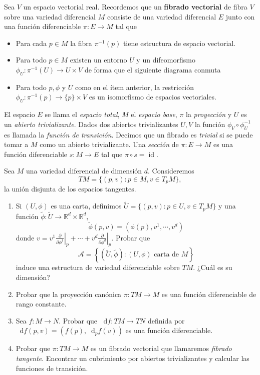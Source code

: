 \documentclass[12pt, a4paper]{amsart}
\theoremstyle{definition}
\newcommand{\RR}{\mathbb{R}}      %
\newcommand*\diff{\mathop{}\!\mathrm{d}}
\DeclareMathOperator{\id}{id}
\begin{document}
Sea $V$ un espacio vectorial real. Recordemos que un \textbf{fibrado vectorial} de fibra $V$ sobre una variedad diferencial $M$ consiste de una variedad diferencial $E$ junto con una función diferenciable $\pi:E\to M$ tal que
\begin{itemize} 
\item Para cada $p\in M$ la fibra $\pi^{-1}(p)$ tiene estructura de espacio vectorial.
\item Para todo $p\in M$ existen un entorno $U$ y un difeomorfismo $\phi_U:\pi^{-1}(U)\to U\times V$ de forma que el siguiente diagrama conmuta
\begin{center}
\end{center}
\item Para todo $p,\phi$ y $U$ como en el ítem anterior, la restricción $\phi_U:\pi^{-1}(p)\to \{p\}\times V$ es un isomorfismo de espacios vectoriales.
\end{itemize}
El espacio $E$ se llama el \textit{espacio total}, $M$ el \textit{espacio base}, $\pi$ la \textit{proyección} y $U$ es un \textit{abierto trivializante}. Dados dos abiertos trivializantes $U,V$ la función $\phi_V\circ\phi_U^{-1}$ es llamada la \textit{función de transición}. Decimos que un fibrado es \textit{trivial} si se puede tomar a $M$ como un abierto trivializante. Una \textit{sección} de $\pi:E\to M$ es una función diferenciable $s:M\to E$ tal que $\pi\circ s = \id$.

\begin{question}
Sea $M$ una variedad diferencial de dimensión $d$. Consideremos $$TM = \{(p,v):p\in M, v\in T_pM\},$$ la unión disjunta de los espacios tangentes.
\begin{enumerate}[label=\textbf{\alph*.}]
\item Si $(U,\phi)$ es una carta, definimos $\widetilde{U} = \{(p,v):p\in U, v\in T_p M\}$ y una función $\widetilde{\phi}:\widetilde{U}\to\RR^d\times\RR^d$, $$\widetilde{\phi}(p,v)=\left(\phi(p),v^1,\cdots,v^d\right)$$ donde $v=v^1\left.\frac{\partial}{\partial \phi^1}\right|_p+\cdots+v^d\left.\frac{\partial}{\partial\phi^d}\right|_p$. Probar que $$\mathscr{A}=\left\{(\widetilde{U},\widetilde{\phi}) : (U,\phi)\text{ carta de }M \right\}$$ induce una estructura de variedad diferenciable sobre $TM$. ¿Cuál es su dimensión?
\item Probar que la proyección canónica $\pi:TM\to M$ es una función diferenciable de rango constante.
\item Sea $f:M\to N$. Probar que $\diff f:TM\to TN$ definida por $\diff f(p,v) = (f(p),\diff_p f(v))$ es una función diferenciable.
\item Probar que $\pi:TM\to M$ es un fibrado vectorial que llamaremos \textit{fibrado tangente}. Encontrar un cubrimiento por abiertos trivializantes y calcular las funciones de transición. 
\end{enumerate}
\end{question}
\end{document}
